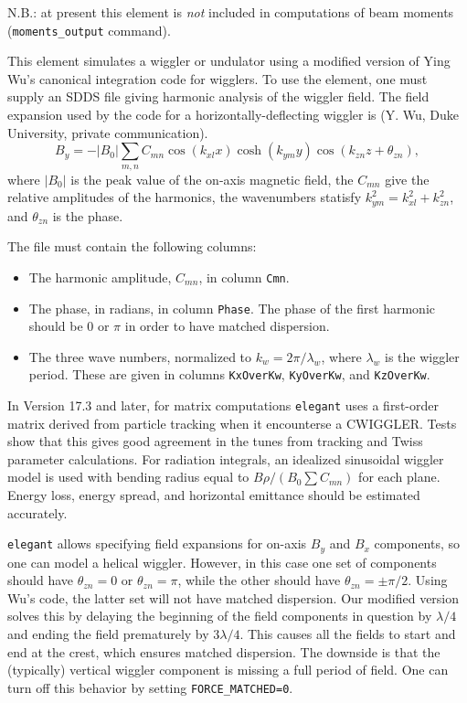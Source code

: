 N.B.: at present this element is {\em not} included in computations
of beam moments (\verb|moments_output| command).

This element simulates a wiggler or undulator using a modified version of Ying Wu's
canonical integration code for wigglers.  To use the element, one must
supply an SDDS file giving harmonic analysis of the wiggler field.
The field expansion used by the code for a horizontally-deflecting
wiggler is (Y. Wu, Duke University, private communication).
\begin{equation}
B_y = -\left|B_0\right| \sum_{m,n} C_{mn}\cos(k_{xl} x) \cosh (k_{ym} y)
\cos(k_{zn} z + \theta_{zn}),
\end{equation}
where $\left|B_0\right|$ is the peak value of the on-axis magnetic field,
the $C_{mn}$ give the relative amplitudes of the harmonics, the wavenumbers
statisfy $k^2_{ym} = k^2_{xl} + k^2_{zn}$, and $\theta_{zn}$ is the phase.

The file must contain the following columns:
\begin{itemize}
\item The harmonic amplitude, $C_{mn}$, in column {\tt Cmn}.
\item The phase, in radians, in column {\tt Phase}.  The phase of the first
harmonic should be 0 or $\pi$ in order to have matched dispersion.
\item The three wave numbers, normalized to $k_w = 2\pi/\lambda_w$, where
 $\lambda_w$ is the wiggler period.  These are given in columns 
 {\tt KxOverKw}, {\tt KyOverKw}, and {\tt KzOverKw}.
\end{itemize}

In Version 17.3 and later, for matrix computations {\tt elegant} uses
a first-order matrix derived from particle tracking when it
encounterse a CWIGGLER.  Tests show that this gives good agreement in
the tunes from tracking and Twiss parameter calculations.  For
radiation integrals, an idealized sinusoidal wiggler model is used
with bending radius equal to $B\rho/(B_0 \sum C_{mn})$ for each plane.
Energy loss, energy spread, and horizontal emittance should be estimated
accurately.

{\tt elegant} allows specifying field expansions for on-axis $B_y$ and
$B_x$ components, so one can model a helical wiggler.  However, in this
case one set of components should have $\theta_{zn} = 0$ or $\theta_{zn}=\pi$,
while the other should have $\theta_{zn} = \pm \pi/2$.
Using Wu's code, the latter set will not have matched dispersion.  Our
modified version solves this by delaying the beginning of the field
components in question by $\lambda/4$ and ending the field prematurely
by $3\lambda/4$.  This causes all the fields to start and end at the
crest, which ensures matched dispersion.  The downside is that the
(typically) vertical wiggler component is missing a full period of
field.  One can turn off this behavior by setting \verb|FORCE_MATCHED=0|.


